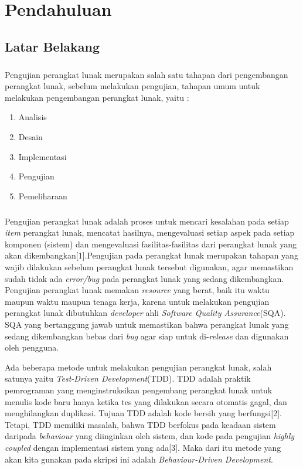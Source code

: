 \chapter{Pendahuluan}
\label{chap:intro}
   
\section{Latar Belakang}
\label{sec:label}
\paragraph{}
Pengujian perangkat lunak merupakan salah satu tahapan dari pengembangan perangkat lunak, sebelum melakukan pengujian, tahapan umum untuk melakukan pengembangan perangkat lunak, yaitu :
\begin{enumerate}
\item Analisis
\item Desain
\item Implementasi
\item Pengujian
\item Pemeliharaan
\end{enumerate}
\paragraph{}
Pengujian perangkat lunak adalah proses untuk mencari kesalahan pada setiap \textit{item} perangkat lunak, mencatat hasilnya, mengevaluasi setiap aspek pada setiap komponen (sistem) dan mengevaluasi fasilitas-fasilitas dari perangkat lunak yang akan dikembangkan[1].Pengujian pada perangkat lunak merupakan tahapan yang wajib dilakukan sebelum perangkat lunak tersebut digunakan, agar memastikan sudah tidak ada \textit{error/bug} pada perangkat lunak yang sedang dikembangkan. Pengujian perangkat lunak memakan \textit{resource} yang berat, baik itu waktu maupun waktu maupun tenaga kerja, karena untuk melakukan pengujian perangkat lunak dibutuhkan \textit{developer} ahli \textit{Software Quality Assurance}(SQA). SQA yang bertanggung jawab untuk memastikan bahwa perangkat lunak yang sedang dikembangkan bebas dari \textit{bug} agar siap untuk di-\textit{release} dan digunakan oleh pengguna.

Ada beberapa metode untuk melakukan pengujian perangkat lunak, salah satunya yaitu \textit{Test-Driven Development}(TDD). TDD adalah praktik pemrograman yang menginstruksikan pengembang perangkat lunak untuk menulis kode baru hanya ketika tes yang dilakukan secara otomatis gagal, dan menghilangkan duplikasi. Tujuan TDD adalah kode bersih yang berfungsi[2]. Tetapi, TDD memiliki masalah, bahwa TDD berfokus pada keadaan sistem daripada \textit{behaviour} yang diinginkan oleh sistem, dan kode pada pengujian \textit{highly coupled} dengan implementasi sistem yang ada[3]. Maka dari itu metode yang akan kita gunakan pada skripsi ini adalah \textit{Behaviour-Driven Development}.

